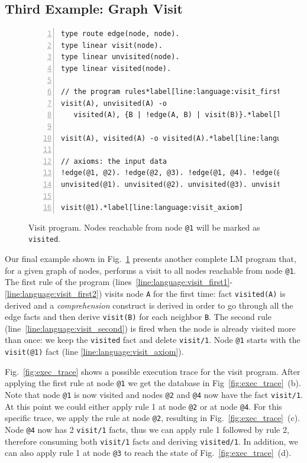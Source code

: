 \subsection{Third Example: Graph Visit}

\begin{figure}[h!]
\begin{Verbatim}[numbers=left,fontsize=\codesize,commandchars=\*\[\]]
type route edge(node, node).
type linear visit(node).
type linear unvisited(node).
type linear visited(node).

// the program rules*label[line:language:visit_first1]
visit(A), unvisited(A) -o
   visited(A), {B | !edge(A, B) | visit(B)}.*label[line:language:visit_first2]*label[line:language:visit_comprehension]

visit(A), visited(A) -o visited(A).*label[line:language:visit_second]

// axioms: the input data
!edge(@1, @2). !edge(@2, @3). !edge(@1, @4). !edge(@2, @4).
unvisited(@1). unvisited(@2). unvisited(@3). unvisited(@4).

visit(@1).*label[line:language:visit_axiom]
\end{Verbatim}
  \caption{Visit program. Nodes reachable from node \texttt{@1} will be marked
     as \texttt{visited}.}
  \label{code:visit}
\end{figure}
\normalsize

Our final example shown in Fig.~\ref{code:visit} presents another complete LM
program that, for a given graph of nodes, performs a visit to all nodes
reachable from node \texttt{@1}.  The first rule of the program
(lines~\ref{line:language:visit_first1}-\ref{line:language:visit_first2}) visits
node \texttt{A} for the first time: fact \texttt{visited(A)} is derived and a
\emph{comprehension} construct is derived in order to go through all the edge
facts and then derive \texttt{visit(B)} for each neighbor \texttt{B}.  The
second rule (line~\ref{line:language:visit_second}) is fired when the node is
already visited more than once: we keep the \texttt{visited} fact and delete
\texttt{visit/1}. Node \texttt{@1} starts with the \texttt{visit(@1)} fact (line
\ref{line:language:visit_axiom}).

Fig.~\ref{fig:exec_trace} shows a possible execution trace for the visit
program.  After applying the first rule at node \texttt{@1} we get the database
in Fig~\ref{fig:exec_trace}~(b).  Note that node \texttt{@1} is now visited and
nodes \texttt{@2} and \texttt{@4} now have the fact \texttt{visit/1}. At this
point we could either apply rule 1 at node \texttt{@2} or at node \texttt{@4}.
For this specific trace, we apply the rule at node \texttt{@2}, resulting in
Fig.~\ref{fig:exec_trace}~(c). Node \texttt{@4} now has 2 \texttt{visit/1}
facts, thus we can apply rule 1 followed by rule 2, therefore consuming both
\texttt{visit/1} facts and deriving \texttt{visited/1}. In addition, we can also
apply rule 1 at node \texttt{@3} to reach the state of
Fig.~\ref{fig:exec_trace}~(d).

